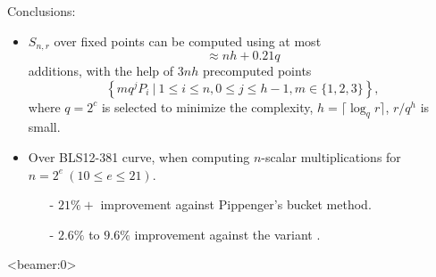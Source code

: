\documentclass{beamer}                  %
\newcommand{\UW}[1]{\textbf{\textcolor{black}{#1}}}
\newcommand{\UWtitle}[1]{
	\begin{textblock}{12.8}(0.0,0.7)
		\begin{center} 
			\textbf{\UW{\Large{#1}}}
		\end{center}
	\end{textblock}
}
\newcommand{\fillframe}{\vspace*{10cm}}
\begin{document}
\begin{frame}
	
	    \begin{block}{Conclusions:}
	        \begin{itemize}
	           \item 	$S_{n,r}$ over fixed points can be computed using at most $$\approx nh + 0.21q$$
	           								additions, with the help of $3 nh$ precomputed points
	           								\begin{equation*}
	           								\left\{mq^jP_i\ |\ 1\le i\le n,0\le j\le  h -1,m\in \{1,2,3\}\right\},
	           								\end{equation*}	
	           			where $q=2^c$ is selected to minimize the complexity, $h = \lceil \log_q r\rceil$, $r/q^h$ is small.
	           \vspace{0.1in}
	           
	           \item Over BLS12-381 curve, when computing $n$-scalar multiplications for $n = 2^{e}\ (10\le e \le 21)$.
	                \begin{itemize}
	                \item[-] $21\%+$ improvement against Pippenger's bucket method.
	                \item[-] $2.6\%$ to $9.6\%$ improvement against the variant \cite{brickell1995fast}.
	                \end{itemize}
	        \end{itemize}
	        \end{block}
		
\end{frame}



\begin{frame}<beamer:0> %

\vspace{0.75in}


\end{frame}



%
\end{document}
